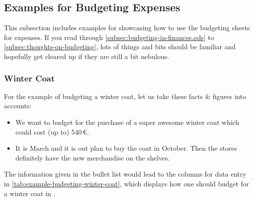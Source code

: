 \subsection{Examples for Budgeting Expenses}
\label{subsec:examples-budgeting-expenses}

This subsection includes examples for showcasing how to use the budgeting sheets for expenses.
If you read through \autoref{subsec:budgeting-in-finances.ods} to \autoref{subsec:thoughts-on-budgeting}, lots of things and bits should be familiar and hopefully get cleared up if they are still a bit nebulous.

\subsubsection{Winter Coat}
\label{subsubsec:example-budgeting-winter-coat}

For the example of budgeting a winter coat, let us take these facts \& figures into accounts:
\begin{itemize}
	\item We want to budget for the purchase of a super awesome winter coat which could cost (up to) 540\,€.
	\item It is March and it is out plan to buy the coat in October.
	Then the stores definitely have the new merchandise on the shelves.
\end{itemize}

The information given in the bullet list would lead to the columns for data entry in \autoref{tab:example-budgeting-winter-coat}, which displays how one should budget for a winter coat in \tfn.

